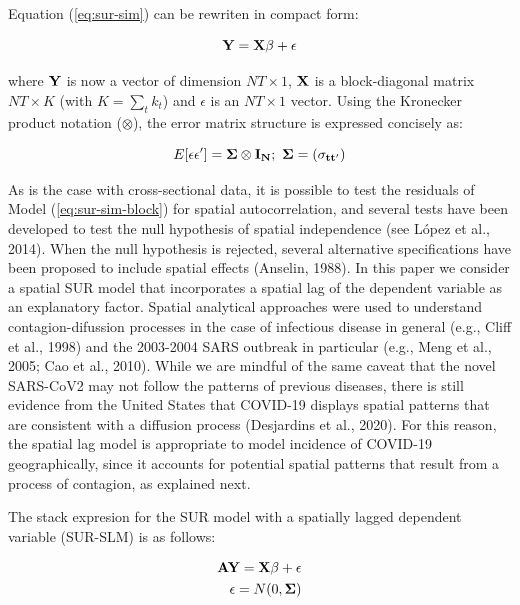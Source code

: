 \documentclass[]{elsarticle} %
\begin{document}
Equation (\ref{eq:sur-sim}) can be rewriten in compact form:

\begin{equation}
\bf{Y} = \bf{X} \beta + \epsilon
\label{eq:sur-sim-block}
\end{equation}

\noindent where \(\bf{Y}\) is now a vector of dimension \(NT \times 1\),
\(\bf{X}\) is a block-diagonal matrix \(NT \times K\) (with
\(K = \sum_t{k_t}\)) and \(\epsilon\) is an \(NT \times 1\) vector.
Using the Kronecker product notation (\(\otimes\)), the error matrix
structure is expressed concisely as:

\begin{equation}
E[\epsilon \epsilon']=\bf{\Sigma} \otimes \bf{I_N} ; \ \bf{\Sigma}=(\sigma_{tt'})
\end{equation}

As is the case with cross-sectional data, it is possible to test the
residuals of Model (\ref{eq:sur-sim-block}) for spatial autocorrelation,
and several tests have been developed to test the null hypothesis of
spatial independence (see López et al., 2014). When the null hypothesis
is rejected, several alternative specifications have been proposed to
include spatial effects (Anselin, 1988). In this paper we consider a
spatial SUR model that incorporates a spatial lag of the dependent
variable as an explanatory factor. Spatial analytical approaches were
used to understand contagion-difussion processes in the case of
infectious disease in general (e.g., Cliff et al., 1998) and the
2003-2004 SARS outbreak in particular (e.g., Meng et al., 2005; Cao et
al., 2010). While we are mindful of the same caveat that the novel
SARS-CoV2 may not follow the patterns of previous diseases, there is
still evidence from the United States that COVID-19 displays spatial
patterns that are consistent with a diffusion process (Desjardins et
al., 2020). For this reason, the spatial lag model is appropriate to
model incidence of COVID-19 geographically, since it accounts for
potential spatial patterns that result from a process of contagion, as
explained next.

The stack expresion for the SUR model with a spatially lagged dependent
variable (SUR-SLM) is as follows:

\begin{equation}
\label{eq:sur-slm}
\begin{aligned}
\bf{AY} = \bf{X} \beta + \epsilon \\
\epsilon =N(0,\bf{\Sigma})
\end{aligned}
\end{equation}
\end{document}
